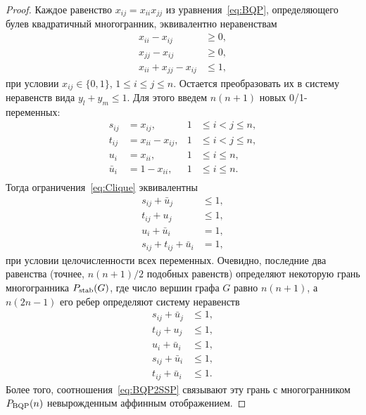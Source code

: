 \begin{proof}
	Каждое равенство $x_{ij} = x_{ii} x_{jj}$ из уравнения~\eqref{eq:BQP}, определяющего булев квадратичный многогранник, эквивалентно неравенствам
	\begin{equation}
	\label{eq:Clique}
	\begin{aligned}
	x_{ii} - x_{ij} &\ge 0, \\
	x_{jj} - x_{ij} &\ge 0, \\
	x_{ii} + x_{jj} - x_{ij} &\le 1,
	\end{aligned}
	\end{equation}
	при условии $x_{ij}\in\{0, 1\}$, $1\le i \le j \le n$.
	Остается преобразовать их в систему неравенств вида $y_l + y_m \le 1$. %
	Для этого введем $n(n+1)$ новых 0/1-переменных:
	\begin{equation}
	\label{eq:BQP2SSP}
	\begin{aligned}
	s_{ij} &= x_{ij},           & 1 &\le i  <  j \le n,\\
	t_{ij} &= x_{ii} - x_{ij},  & 1 &\le i  <  j \le n,\\
	u_i    &= x_{ii},           & 1 &\le i \le n,\\
	\bar{u}_i    &= 1 - x_{ii}, & 1 &\le i \le n.\\
	\end{aligned}
	\end{equation}
	Тогда ограничения~\eqref{eq:Clique} эквивалентны
	\[
	\begin{aligned}
	s_{ij} + \bar{u}_j & \le 1, \\
	t_{ij} + u_j       & \le 1, \\
	u_i    + \bar{u}_i & =   1, \\
	s_{ij} + t_{ij} + \bar{u}_i & = 1,
	\end{aligned}
	\]
	при условии целочисленности всех переменных.
	Очевидно, последние два равенства (точнее, $n(n+1)/2$ подобных равенств)
	определяют некоторую грань многогранника $P_{\textup{stab}}(G)$, где число вершин графа $G$ равно $n(n+1)$, а $n (2n - 1)$ его ребер определяют систему неравенств
	\[
	\begin{aligned}
	s_{ij} + \bar{u}_j & \le 1, \\
	t_{ij} + u_j       & \le 1, \\
	u_i    + \bar{u}_i & \le 1, \\
	s_{ij} + \bar{u}_i & \le 1, \\
	t_{ij} + \bar{u}_i & \le 1.
	\end{aligned}
	\]
	Более того, соотношения~\eqref{eq:BQP2SSP} связывают эту грань с многогранником $P_{\textup{BQP}}(n)$ невырожденным аффинным отображением.
\end{proof}


